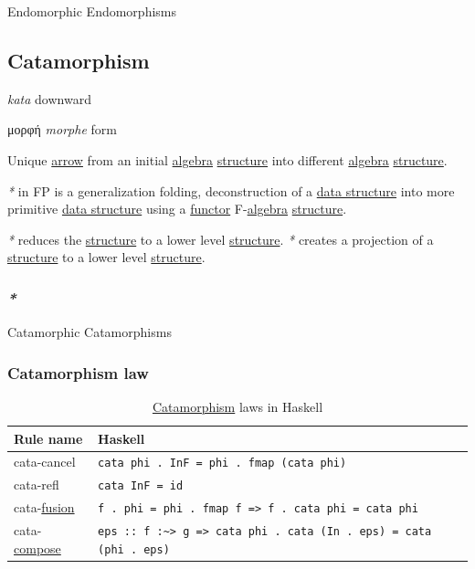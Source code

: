 \documentclass[a4paper,14pt,oneside]{book}
\begin{document}
\label{org541ce80}Endomorphic
\label{org4e6f08a}Endomorphisms

\subsection{\label{orgc1a907c}Catamorphism}
\label{sec:orgcf5f467}
 \emph{kata} downward

\textgreek{μορφή} \emph{morphe} form

Unique \hyperref[org7ee69dd]{arrow} from an initial \hyperref[orgc379d8d]{algebra} \hyperref[org733a486]{structure} into different \hyperref[orgc379d8d]{algebra} \hyperref[org733a486]{structure}.

\emph{*} in FP is a generalization folding, deconstruction of a \hyperref[orgdd6dffc]{data structure} into more primitive \hyperref[orgdd6dffc]{data structure} using a \hyperref[org3f64a05]{functor} F-\hyperref[orgc379d8d]{algebra} \hyperref[org733a486]{structure}. 

\emph{*} reduces the \hyperref[org733a486]{structure} to a lower level \hyperref[org733a486]{structure}.
\emph{*} creates a projection of a \hyperref[org733a486]{structure} to a lower level \hyperref[org733a486]{structure}.

\subsubsection{\emph{*}}
\label{sec:org1270365}

\label{org9a3c34d}Catamorphic
\label{org275806c}Catamorphisms

\subsubsection{\label{orgd5f6509}Catamorphism law}
\label{sec:org45f3dcd}
\begin{table}[htbp]
\caption{\label{tab--catamorphism-law-in-haskell}\hyperref[orgc1a907c]{Catamorphism} laws in Haskell}
\centering
\begin{tabu} spread \linewidth {ll}
\toprule
Rule name & Haskell\\
\midrule
cata-cancel & \texttt{cata phi . InF = phi . fmap (cata phi)}\\
cata-refl & \texttt{cata InF = id}\\
cata-\hyperref[org4fe02d6]{fusion} & \texttt{f . phi = phi . fmap f => f . cata phi = cata phi}\\
cata-\hyperref[orgbc86437]{compose} & \texttt{eps :: f :\textasciitilde{}> g => cata phi . cata (In . eps) = cata (phi . eps)}\\
\bottomrule
\end{tabu}
\end{table}
\end{document}
